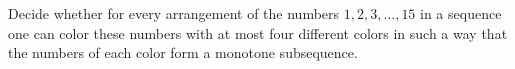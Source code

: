 Decide whether for every arrangement of the numbers $1,2,3, . . . ,15$ in a sequence one can color these numbers with at most four different colors in such a way that the numbers of each color form a monotone subsequence.